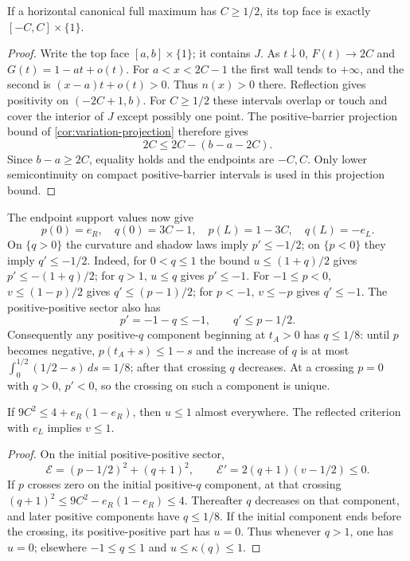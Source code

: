 \begin{lemma}\label{lem:horizontal-top}
If a horizontal canonical full maximum has $C\ge1/2$, its top
face is exactly $[-C,C]\times\{1\}$.
\end{lemma}
\begin{proof}
Write the top face $[a,b]\times\{1\}$; it contains $J$.
As $t\downarrow0$, $F(t)\to2C$ and $G(t)=1-at+o(t)$.
For $a<x<2C-1$ the first wall tends to $+\infty$, and
the second is $(x-a)t+o(t)>0$. Thus $n(x)>0$ there.
Reflection gives positivity on $(-2C+1,b)$.
For $C\ge1/2$ these intervals overlap or touch and cover the
interior of $J$ except possibly one point.
The positive-barrier projection bound of
\cref{cor:variation-projection} therefore gives
\[
 2C\le2C-(b-a-2C).
\]
Since $b-a\ge2C$, equality holds and the endpoints are $-C,C$.
Only lower semicontinuity on compact positive-barrier intervals
is used in this projection bound.
\end{proof}

The endpoint support values now give
\begin{equation}\label{eq:horizontal-corner-ends}
 p(0)=e_R,\quad q(0)=3C-1,\quad
 p(L)=1-3C,\quad q(L)=-e_L.
\end{equation}
On $\{q>0\}$ the curvature and shadow laws imply $p'\le-1/2$;
on $\{p<0\}$ they imply $q'\le-1/2$.
Indeed, for $0<q\le1$ the bound $u\le(1+q)/2$ gives
$p'\le-(1+q)/2$; for $q>1$, $u\le q$ gives $p'\le-1$.
For $-1\le p<0$, $v\le(1-p)/2$ gives
$q'\le(p-1)/2$; for $p<-1$, $v\le-p$ gives $q'\le-1$.
The positive-positive sector also has
\[
 p'=-1-q\le-1,\qquad q'\le p-1/2.
\]
Consequently any positive-$q$ component beginning at $t_A>0$
has $q\le1/8$: until $p$ becomes negative,
$p(t_A+s)\le1-s$ and the increase of $q$ is at most
$\int_0^{1/2}(1/2-s)\,ds=1/8$; after that crossing $q$
decreases. At a crossing $p=0$ with $q>0$, $p'<0$,
so the crossing on such a component is unique.

\begin{lemma}\label{lem:horizontal-energy}
If $9C^2\le4+e_R(1-e_R)$, then $u\le1$ almost everywhere.
The reflected criterion with $e_L$ implies $v\le1$.
\end{lemma}
\begin{proof}
On the initial positive-positive sector,
\[
 \mathcal E=(p-1/2)^2+(q+1)^2,\qquad
 \mathcal E'=2(q+1)(v-1/2)\le0.
\]
If $p$ crosses zero on the initial positive-$q$ component, at
that crossing
$(q+1)^2\le9C^2-e_R(1-e_R)\le4$.
Thereafter $q$ decreases on that component, and later positive
components have $q\le1/8$. If the initial component ends before
the crossing, its positive-positive part has $u=0$.
Thus whenever $q>1$, one has $u=0$; elsewhere $-1\le q\le1$
and $u\le\kappa(q)\le1$.
\end{proof}

